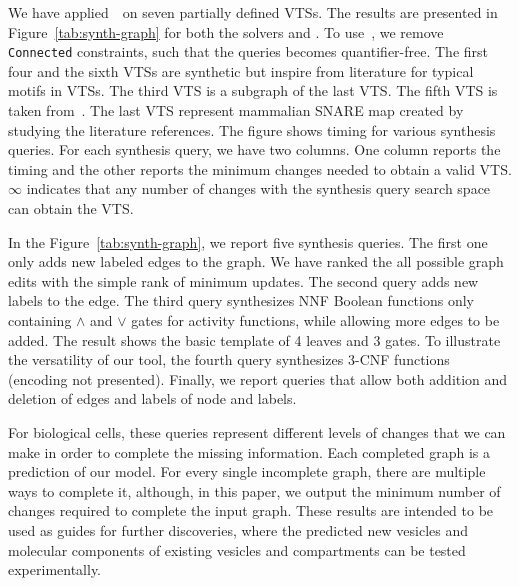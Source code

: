 
We have applied~\ourtool~on seven partially defined VTSs.
%
The results are presented in Figure~\ref{tab:synth-graph} for both the solvers
\depqbf and \zthree.
%
To use~\zthree, we remove \texttt{Connected} constraints, such that the queries becomes
quantifier-free.
%
The first four and the sixth VTSs are synthetic but inspire from literature for
typical motifs in VTSs. 
%
The third VTS is a subgraph of the last VTS.
%
%
The fifth VTS is taken from~\cite{burri2004complete}.
%
The last VTS represent mammalian SNARE map created by studying the literature references.  
%
The figure shows timing for various synthesis queries.
%
For each synthesis query, we have two columns.
%
One column reports the timing and the other reports the minimum changes needed to obtain a valid VTS.
%
$\infty$ indicates that any number of changes with the synthesis query
search space can obtain the VTS.

In the Figure~\ref{tab:synth-graph}, we report five synthesis queries.
%
The first one only adds new labeled edges to the graph.
%
We have ranked the all possible graph edits with the simple rank of
minimum updates.
%
The second query adds new labels to the edge.
%
The third query synthesizes NNF Boolean functions only containing
$\land$ and $\lor$ gates for activity functions, while allowing
more edges to be added.
%
The result shows the basic template of 4 leaves and 3 gates.
%
To illustrate the versatility of our tool, the fourth query
synthesizes $3$-CNF functions (encoding not presented).
%
Finally, we report queries that allow both addition and deletion of edges and labels of node and labels. 

For biological cells, these queries represent different levels of changes that we can make in order to complete the missing information.
%
Each completed graph is a prediction of our model. 
%
For every single incomplete graph, there are multiple ways to complete it, although, in this paper, we output the minimum number of changes required to complete the input graph. 
%
These results are intended to be used as guides for further discoveries, where the predicted new vesicles and molecular components of existing vesicles and compartments can be tested experimentally.
%
%
